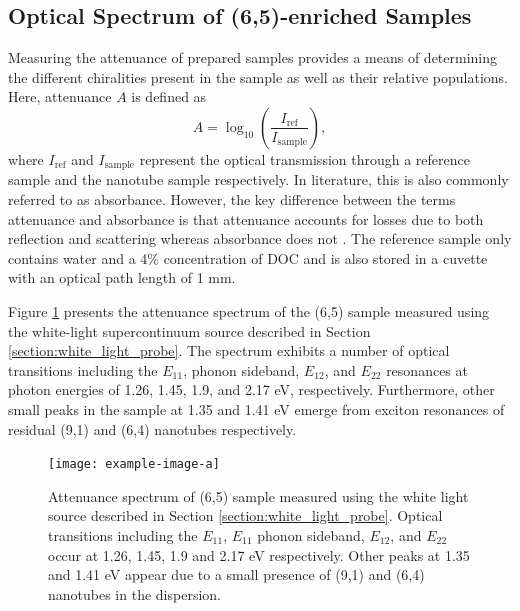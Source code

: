 


\subsection{Optical Spectrum of (6,5)-enriched Samples}

Measuring the attenuance of prepared samples provides a means of determining the different chiralities present in the sample as well as their relative populations. Here, attenuance $A$ is defined as
\begin{equation}
A = \log_{10}\left(\dfrac{I_{\mathrm{ref}}}{I_{\mathrm{sample}}}\right),
\end{equation}
where $I_{\mathrm{ref}}$ and $I_{\mathrm{sample}}$ represent the optical transmission through a reference sample and the nanotube sample respectively. In literature, this is also commonly referred to as absorbance. However, the key difference between the terms attenuance and absorbance is that attenuance accounts for losses due to both reflection and scattering whereas absorbance does not \cite{dixon1992absorbance}. The reference sample only contains water and a 4\% concentration of DOC and is also stored in a cuvette with an optical path length of 1 mm.

Figure \ref{fig:sample_absorbance} presents the attenuance spectrum of the (6,5) sample measured using the white-light supercontinuum source described in Section \ref{section:white_light_probe}. The spectrum exhibits a number of optical transitions including the $E_{11}$, phonon sideband, $E_{12}$, and $E_{22}$ resonances at photon energies of 1.26, 1.45, 1.9, and 2.17 eV, respectively. Furthermore, other small peaks in the sample at 1.35 and 1.41 eV emerge from exciton resonances of residual (9,1) and (6,4) nanotubes respectively.

\begin{figure}[H]
	\centering
	\texttt{[image: example-image-a]}
	\caption{ Attenuance spectrum of (6,5) sample measured using the white light source described in Section \ref{section:white_light_probe}. Optical transitions including the $E_{11}$, $E_{11} $ phonon sideband, $E_{12}$, and $E_{22}$ occur at 1.26, 1.45, 1.9 and 2.17 eV respectively. Other peaks at 1.35 and 1.41 eV appear due to a small presence of (9,1) and (6,4) nanotubes in the dispersion.}
	\label{fig:sample_absorbance}
\end{figure}

